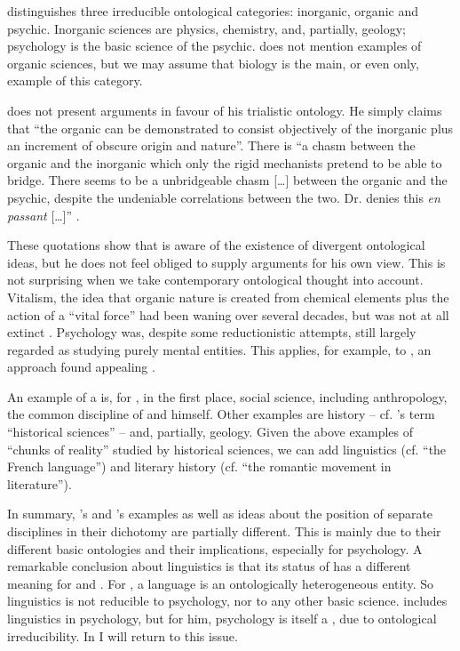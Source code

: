 \documentclass[output=paper]{langscibook}
\begin{document}
{\Sapir} distinguishes three irreducible ontological categories: inorganic, organic and psychic. Inorganic sciences are physics, chemistry, and, partially, geology; psychology is the basic science of the psychic. {\Sapir} does not mention examples of organic sciences, but we may assume that biology is the main, or even only, example of this category.

{\Sapir} does not present arguments in favour of his trialistic ontology. He simply claims that ``the organic can be demonstrated to consist objectively of the inorganic plus an increment of obscure origin and nature''. There is ``a chasm between the organic and the inorganic which only the rigid mechanists pretend to be able to bridge. There seems to be a unbridgeable chasm […] between the organic and the psychic, despite the undeniable correlations between the two. Dr. {\Kroeber} denies this \emph{en passant} […]'' \citep[444]{Sapir1917}.

These quotations show that {\Sapir} is aware of the existence of divergent ontological ideas, but he does not feel obliged to supply arguments for his own view. This is not surprising when we take contemporary ontological thought into account. Vitalism, the idea that organic nature is created from chemical elements plus the action of a ``vital force'' had been waning over several decades, but was not at all extinct \citep[cf.][]{Beckner1967}. Psychology was, despite some reductionistic attempts, still largely regarded as studying purely mental entities. This applies, for example, to , an approach {\Sapir} found appealing \citep[cf.][xvi]{Sapir2002}.

An example of a  is, for {\Sapir}, in the first place, social science, including anthropology, the common discipline of {\Kroeber} and himself. Other examples are history -- cf. {\Sapir}'s term ``historical sciences'' -- and, partially, geology. Given the above examples of ``chunks of reality'' studied by historical sciences, we can add linguistics (cf. ``the French language'') and literary history (cf. ``the romantic movement in literature'').

In summary, {\Sapir}'s and {\Fodor}'s examples as well as ideas about the position of separate disciplines in their dichotomy are partially different. This is mainly due to their different basic ontologies and their implications, especially for psychology. A remarkable conclusion about linguistics is that its status of  has a different meaning for {\Sapir} and {\Fodor}. For {\Sapir}, a language is an ontologically heterogeneous entity. So linguistics is not reducible to psychology, nor to any other basic science. {\Fodor} includes linguistics in psychology, but for him, psychology is itself a , due to ontological irreducibility. In  I will return to this issue.
\end{document}
